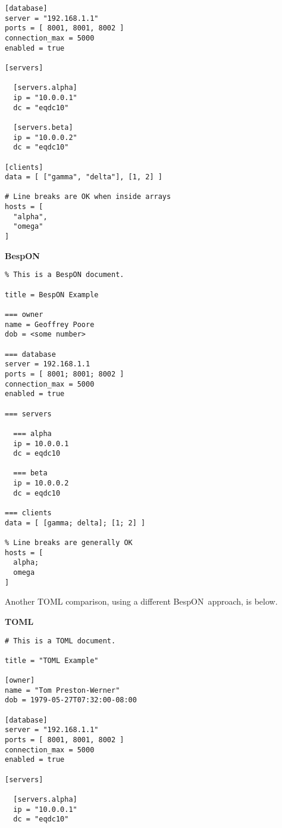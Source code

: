 \documentclass[11pt]{article}
\newcommand{\bespon}{BespON}
\begin{document}
{{\begin{appendices}
\begin{tcolorbox}{}
\begin{multicols}{2}
\begin{Verbatim}[formatcom=\color{DarkGreen}]
[database]
server = "192.168.1.1"
ports = [ 8001, 8001, 8002 ]
connection_max = 5000
enabled = true

[servers]

  [servers.alpha]
  ip = "10.0.0.1"
  dc = "eqdc10"

  [servers.beta]
  ip = "10.0.0.2"
  dc = "eqdc10"

[clients]
data = [ ["gamma", "delta"], [1, 2] ]

# Line breaks are OK when inside arrays
hosts = [
  "alpha",
  "omega"
]
\end{Verbatim}
\columnbreak
\centering \textbf{BespON}

\begin{Verbatim}
% This is a BespON document.

title = BespON Example

=== owner
name = Geoffrey Poore
dob = <some number>

=== database
server = 192.168.1.1
ports = [ 8001; 8001; 8002 ]
connection_max = 5000
enabled = true

=== servers

  === alpha
  ip = 10.0.0.1
  dc = eqdc10

  === beta
  ip = 10.0.0.2
  dc = eqdc10

=== clients
data = [ [gamma; delta]; [1; 2] ]

% Line breaks are generally OK
hosts = [
  alpha;
  omega
]
\end{Verbatim}
\end{multicols}
\end{tcolorbox}


Another TOML comparison, using a different \bespon\ approach, is below.

\begin{tcolorbox}{}
\begin{multicols}{2}

\centering \textbf{TOML}
\begin{Verbatim}[formatcom=\color{DarkGreen}]
# This is a TOML document.

title = "TOML Example"

[owner]
name = "Tom Preston-Werner"
dob = 1979-05-27T07:32:00-08:00

[database]
server = "192.168.1.1"
ports = [ 8001, 8001, 8002 ]
connection_max = 5000
enabled = true

[servers]

  [servers.alpha]
  ip = "10.0.0.1"
  dc = "eqdc10"


\end{Verbatim}
\end{multicols}
\end{tcolorbox}
\end{appendices}}}
\end{document}

